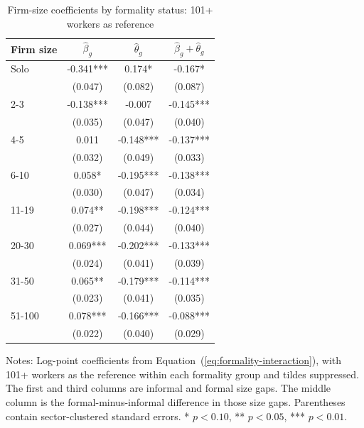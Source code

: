 \begin{table}[htbp]
  \centering
  \caption{Firm-size coefficients by formality status: 101+ workers as reference}
  \label{tab:formality-interaction-coefficients-101-reference}
  \small
  \begin{tabular}{lccc}
    \toprule
    Firm size & $\hat{\beta}_g$ & $\hat{\theta}_g$ & $\hat{\beta}_g+\hat{\theta}_g$ \\
    \midrule
    Solo & -0.341*** & 0.174* & -0.167* \\
     & (0.047) & (0.082) & (0.087) \\
    2-3 & -0.138*** & -0.007 & -0.145*** \\
     & (0.035) & (0.047) & (0.040) \\
    4-5 & 0.011 & -0.148*** & -0.137*** \\
     & (0.032) & (0.049) & (0.033) \\
    6-10 & 0.058* & -0.195*** & -0.138*** \\
     & (0.030) & (0.047) & (0.034) \\
    11-19 & 0.074** & -0.198*** & -0.124*** \\
     & (0.027) & (0.044) & (0.040) \\
    20-30 & 0.069*** & -0.202*** & -0.133*** \\
     & (0.024) & (0.041) & (0.039) \\
    31-50 & 0.065** & -0.179*** & -0.114*** \\
     & (0.023) & (0.041) & (0.035) \\
    51-100 & 0.078*** & -0.166*** & -0.088*** \\
     & (0.022) & (0.040) & (0.029) \\
    \bottomrule
  \end{tabular}
  \vspace{0.3em}
  \begin{minipage}{0.92\textwidth}
  \footnotesize
  Notes: Log-point coefficients from Equation~(\ref{eq:formality-interaction}), with 101+ workers as the reference within each formality group and tildes suppressed. The first and third columns are informal and formal size gaps. The middle column is the formal-minus-informal difference in those size gaps. Parentheses contain sector-clustered standard errors. * $p<0.10$, ** $p<0.05$, *** $p<0.01$.
  \end{minipage}
\end{table}
